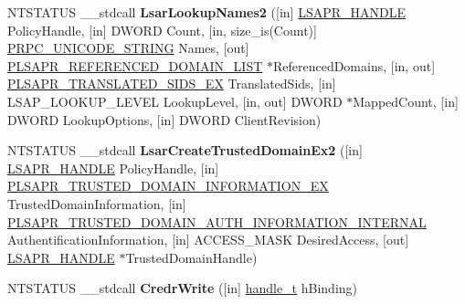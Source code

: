 \begin{DoxyCompactItemize}
\item 
\mbox{\label{interfacelsarpc_ae9d8cb6a530406de0a23fec6eb0a6732}} 
N\+T\+S\+T\+A\+T\+US \+\_\+\+\_\+stdcall {\bfseries Lsar\+Lookup\+Names2} (\mbox{[}in\mbox{]} \hyperlink{interfacevoid}{L\+S\+A\+P\+R\+\_\+\+H\+A\+N\+D\+LE} Policy\+Handle, \mbox{[}in\mbox{]} D\+W\+O\+RD Count, \mbox{[}in, size\+\_\+is(Count)\mbox{]} \hyperlink{struct___r_p_c___u_n_i_c_o_d_e___s_t_r_i_n_g}{P\+R\+P\+C\+\_\+\+U\+N\+I\+C\+O\+D\+E\+\_\+\+S\+T\+R\+I\+NG} Names, \mbox{[}out\mbox{]} \hyperlink{struct___l_s_a_p_r___r_e_f_e_r_e_n_c_e_d___d_o_m_a_i_n___l_i_s_t}{P\+L\+S\+A\+P\+R\+\_\+\+R\+E\+F\+E\+R\+E\+N\+C\+E\+D\+\_\+\+D\+O\+M\+A\+I\+N\+\_\+\+L\+I\+ST} $\ast$Referenced\+Domains, \mbox{[}in, out\mbox{]} \hyperlink{struct___l_s_a_p_r___t_r_a_n_s_l_a_t_e_d___s_i_d_s___e_x}{P\+L\+S\+A\+P\+R\+\_\+\+T\+R\+A\+N\+S\+L\+A\+T\+E\+D\+\_\+\+S\+I\+D\+S\+\_\+\+EX} Translated\+Sids, \mbox{[}in\mbox{]} L\+S\+A\+P\+\_\+\+L\+O\+O\+K\+U\+P\+\_\+\+L\+E\+V\+EL Lookup\+Level, \mbox{[}in, out\mbox{]} D\+W\+O\+RD $\ast$Mapped\+Count, \mbox{[}in\mbox{]} D\+W\+O\+RD Lookup\+Options, \mbox{[}in\mbox{]} D\+W\+O\+RD Client\+Revision)
\item 
\mbox{\label{interfacelsarpc_a2fb5c24fd5fc14ba729cd3d1c378f7bf}} 
N\+T\+S\+T\+A\+T\+US \+\_\+\+\_\+stdcall {\bfseries Lsar\+Create\+Trusted\+Domain\+Ex2} (\mbox{[}in\mbox{]} \hyperlink{interfacevoid}{L\+S\+A\+P\+R\+\_\+\+H\+A\+N\+D\+LE} Policy\+Handle, \mbox{[}in\mbox{]} \hyperlink{struct___l_s_a_p_r___t_r_u_s_t_e_d___d_o_m_a_i_n___i_n_f_o_r_m_a_t_i_o_n___e_x}{P\+L\+S\+A\+P\+R\+\_\+\+T\+R\+U\+S\+T\+E\+D\+\_\+\+D\+O\+M\+A\+I\+N\+\_\+\+I\+N\+F\+O\+R\+M\+A\+T\+I\+O\+N\+\_\+\+EX} Trusted\+Domain\+Information, \mbox{[}in\mbox{]} \hyperlink{struct___l_s_a_p_r___t_r_u_s_t_e_d___d_o_m_a_i_n___a_u_t_h___i_n_f_o_r_m_a_t_i_o_n___i_n_t_e_r_n_a_l}{P\+L\+S\+A\+P\+R\+\_\+\+T\+R\+U\+S\+T\+E\+D\+\_\+\+D\+O\+M\+A\+I\+N\+\_\+\+A\+U\+T\+H\+\_\+\+I\+N\+F\+O\+R\+M\+A\+T\+I\+O\+N\+\_\+\+I\+N\+T\+E\+R\+N\+AL} Authentification\+Information, \mbox{[}in\mbox{]} A\+C\+C\+E\+S\+S\+\_\+\+M\+A\+SK Desired\+Access, \mbox{[}out\mbox{]} \hyperlink{interfacevoid}{L\+S\+A\+P\+R\+\_\+\+H\+A\+N\+D\+LE} $\ast$Trusted\+Domain\+Handle)
\item 
\mbox{\label{interfacelsarpc_a712bf8781685e0659c4437b6c959bffa}} 
N\+T\+S\+T\+A\+T\+US \+\_\+\+\_\+stdcall {\bfseries Credr\+Write} (\mbox{[}in\mbox{]} \hyperlink{interfacevoid}{handle\+\_\+t} h\+Binding)

\end{DoxyCompactItemize}
